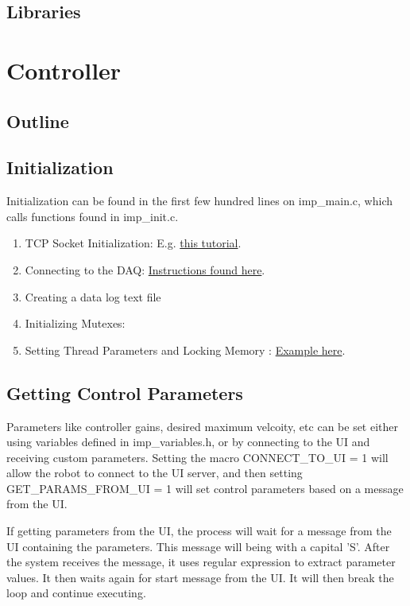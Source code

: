 \documentclass{article}
\begin{document}
	\subsection{Libraries}

\section{Controller}
	\subsection{Outline}
	
	
	\subsection{Initialization}
	Initialization can be found in the first few hundred lines on imp\_main.c, which calls functions found in imp\_init.c. 
	
	\begin{enumerate}
		\item TCP Socket Initialization: E.g. \href{https://www.geeksforgeeks.org/tcp-server-client-implementation-in-c/}{this tutorial}.
		\item Connecting to the DAQ: \href{https://labjack.com/support/software/api/ljm/function-reference/ljmopen}{Instructions found here}.
		\item Creating a data log text file 
		\item Initializing Mutexes: 
		\item Setting Thread Parameters and Locking Memory : \href{https://wiki.linuxfoundation.org/realtime/documentation/howto/applications/application_base}{Example here}.
	\end{enumerate}
	
	\subsection{Getting Control Parameters}
	Parameters like controller gains, desired maximum velcoity, etc can be set either using variables defined in imp\_variables.h, or by connecting to the UI and receiving custom parameters. Setting the macro CONNECT\_TO\_UI = 1 will allow the robot to connect to the UI server, and then setting GET\_PARAMS\_FROM\_UI = 1 will set control parameters based on a message from the UI.

	If getting parameters from the UI, the process will wait for a message from the UI containing the parameters. This message will being with a capital 'S'. After the system receives the message, it uses regular expression to extract parameter values. It then waits again for start message from the UI. It will then break the loop and continue executing.
\end{document}
